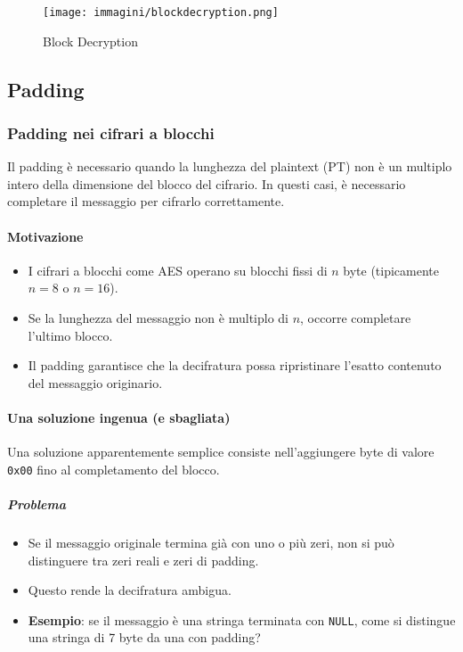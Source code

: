 \documentclass{report}
\begin{document}
\begin{figure}[h]
\centering
\texttt{[image: immagini/blockdecryption.png]}
\caption{Block Decryption}
\end{figure}

\subsection{Padding}
\subsubsection{Padding nei cifrari a blocchi}

Il padding è necessario quando la lunghezza del plaintext (PT) non è un multiplo intero della dimensione del blocco del cifrario. In questi casi, è necessario completare il messaggio per cifrarlo correttamente.

\paragraph{Motivazione}
\begin{itemize}
    \item I cifrari a blocchi come AES operano su blocchi fissi di $n$ byte (tipicamente $n=8$ o $n=16$).
    \item Se la lunghezza del messaggio non è multiplo di $n$, occorre completare l’ultimo blocco.
    \item Il padding garantisce che la decifratura possa ripristinare l’esatto contenuto del messaggio originario.
\end{itemize}

\paragraph{Una soluzione ingenua (e sbagliata)}

Una soluzione apparentemente semplice consiste nell'aggiungere byte di valore \texttt{0x00} fino al completamento del blocco.

\subparagraph{Problema}
\begin{itemize}
    \item Se il messaggio originale termina già con uno o più zeri, non si può distinguere tra zeri reali e zeri di padding.
    \item Questo rende la decifratura ambigua.
    \item \textbf{Esempio}: se il messaggio è una stringa terminata con \texttt{NULL}, come si distingue una stringa di 7 byte da una con padding?
\end{itemize}
\end{document}
